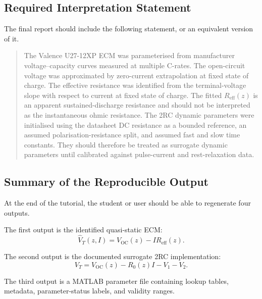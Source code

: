 \documentclass[a4paper,12pt]{article}
\begin{document}
\subsection{Required Interpretation Statement}

The final report should include the following statement, or an equivalent version of it.

\begin{quote}
The Valence U27-12XP ECM was parameterised from manufacturer voltage--capacity curves measured at multiple C-rates.
The open-circuit voltage was approximated by zero-current extrapolation at fixed state of charge.
The effective resistance was identified from the terminal-voltage slope with respect to current at fixed state of charge.
The fitted \(R_{\mathrm{eff}}(z)\) is an apparent sustained-discharge resistance and should not be interpreted as the instantaneous ohmic resistance.
The 2RC dynamic parameters were initialised using the datasheet DC resistance as a bounded reference, an assumed polarisation-resistance split, and assumed fast and slow time constants.
They should therefore be treated as surrogate dynamic parameters until calibrated against pulse-current and rest-relaxation data.
\end{quote}

\subsection{Summary of the Reproducible Output}

At the end of the tutorial, the student or user should be able to regenerate four outputs.

The first output is the identified quasi-static ECM:
\begin{equation}
\boxed{
\hat{V}_T(z,I)
=
V_{\mathrm{OC}}(z)
-
IR_{\mathrm{eff}}(z).
}
\label{eq:deliverables_static_output}
\end{equation}

The second output is the documented surrogate 2RC implementation:
\begin{equation}
\boxed{
V_T
=
V_{\mathrm{OC}}(z)
-
R_0(z)I
-
V_1
-
V_2.
}
\label{eq:deliverables_dynamic_output}
\end{equation}

The third output is a MATLAB parameter file containing lookup tables, metadata, parameter-status labels, and validity ranges.
\end{document}
